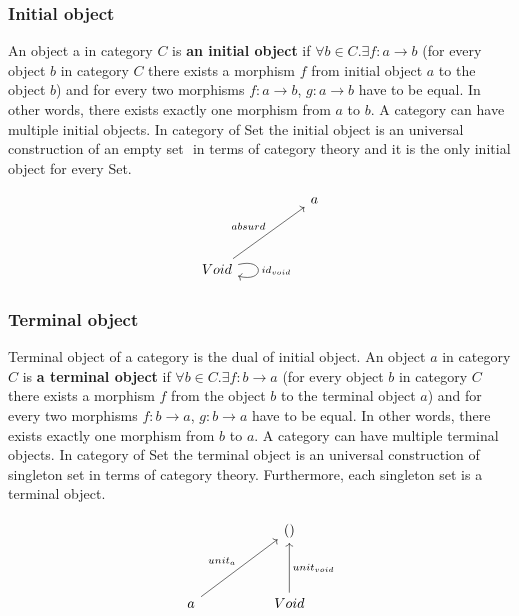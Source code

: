 \documentclass[article]{aaltoseries}
\begin{document}

  \subsubsection{Initial object}
    An object a in category $C$ is \textbf{an initial object} if $\forall b \in C. \exists f: a \rightarrow b$ (for
    every object $b$ in category $C$ there exists a morphism $f$ from initial object $a$
    to the object $b$) and for every two morphisms $f: a \rightarrow b$, $g: a \rightarrow b$ have to be
    equal. In other words, there exists exactly one morphism from $a$ to $b$. A
    category can have multiple initial objects. In category of Set the initial
    object is an universal construction of an empty set ${}$ in terms of category
    theory and it is the only initial object for every Set.

    \[
      \begin{tikzcd}[row sep=huge, column sep=huge]
        & a \\
        Void \arrow[ur, "absurd"]
        \arrow[loop right, distance=2em, "id_{void}"]
        & 
      \end{tikzcd}
    \]


  \subsubsection{Terminal object}
    Terminal object of a category is the dual of initial object. An object $a$ in
    category $C$ is \textbf{a terminal object} if $\forall b \in C. \exists f: b \rightarrow a$ (for every object $b$ in
    category $C$ there exists a morphism $f$ from the object $b$ to the terminal object $a$)
    and for every two morphisms $f: b \rightarrow a$, $g: b \rightarrow a$ have to be equal. In other words,
    there exists exactly one morphism from $b$ to $a$. A category can have multiple
    terminal objects. In category of Set the terminal object is an universal
    construction of singleton set in terms of category theory. Furthermore, each
    singleton set is a terminal object.

    \[
      \begin{tikzcd}[row sep=huge, column sep=huge]
        & () \\
        a \arrow[ur, "unit_a"]
        & Void \arrow[u, "unit_{void}"']
      \end{tikzcd}
    \]
   
\end{document}
